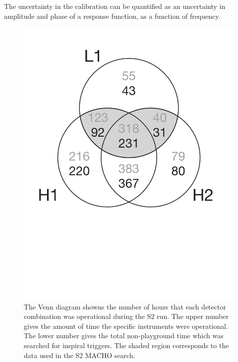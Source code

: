 The uncertainty in the calibration can be quantified as an uncertainty in
amplitude and phase of a response function, as a function of frequency.



\newpage

\begin{figure}[p]
\begin{center}
\includegraphics[width=0.75\linewidth]{figures/result/s2_times}
\end{center}
\caption[Amounts of Single and Coincident Interferometer Data in S2]{%
\label{f:S2times}%
The Venn diagram showns the number of hours that each detector combination was
operational during the S2 run.  The upper number gives the amount of time the
specific instruments were operational.  The lower number gives the total
non-playground time which was searched for inspiral triggers.  The shaded
region corresponds to the data used in the S2 MACHO search.}
\end{figure}

